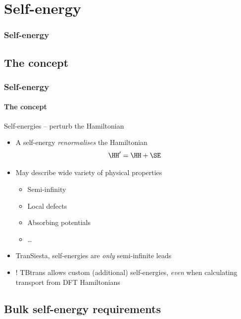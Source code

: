 \section{Self-energy}

\begin{framenologo}
  \frametitle{Self-energy}
  \tableofcontents[currentsection]
\end{framenologo}

\subsection{The concept}

\begin{frame}
  \frametitle{Self-energy}
  \framesubtitle{The concept}

  \begin{block}{Self-energies -- perturb the Hamiltonian}

    \begin{itemize}[<+->]
      \item A self-energy \emph{renormalises} the Hamiltonian
      \begin{equation*}
        \HH' = \HH + \SE
      \end{equation*}
      \item May describe wide variety of physical properties
      \begin{itemize}[<.->]
        \item Semi-infinity
        \item Local defects
        \item Absorbing potentials
        \item \dots
      \end{itemize}
      \item TranSiesta, self-energies are \emph{only} semi-infinite leads

      \item ! TBtrans allows custom (additional) self-energies, \emph{even} when calculating
      transport from DFT Hamiltonians
    \end{itemize}

  \end{block}

\end{frame}

\subsection{Bulk self-energy requirements}


